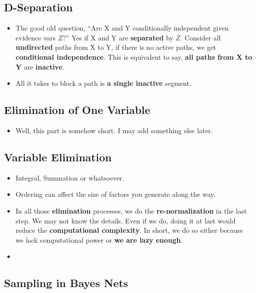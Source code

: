 \documentclass[twocolumn]{article}
\begin{document}
\subsection{D-Separation}
\label{sec:d-separation}

\begin{itemize}
\item The good old question, ``Are X and Y conditionally independent
  given evidence vars $Z$?'' Yes if X and Y are \textbf{separated} by
  $Z$. Consider all \textbf{undirected} paths from X to Y, if there is
  no active paths, we get \textbf{conditional independence}. This is
  equivalent to say, \textbf{all paths from X to Y} are
  \textbf{inactive}. 
\item All it takes to block a path is \textbf{a single inactive}
  segment. 
\end{itemize}

\subsection{Elimination of One Variable}
\label{sec:elim-one-vari}

\begin{itemize}
\item Well, this part is somehow short. I may add something else
  later. 
\end{itemize}

\subsection{Variable Elimination}
\label{sec:variable-elimination}

\begin{itemize}
\item Integral, Summation or whatsoever.
\item Ordering can affect the size of factors you generate along the
  way. 
\item In all those \textbf{elimination} processes, we do the
  \textbf{re-normalization} in the last step. We may not know the
  details. Even if we do, doing it at last would reduce the
  \textbf{computational complexity}. In short, we do so either because
  we lack computational power or \textbf{we are lazy enough}.
\item 
\end{itemize}

\subsection{Sampling in Bayes Nets}
\label{sec:sampling-in-bayes}
\end{document}
